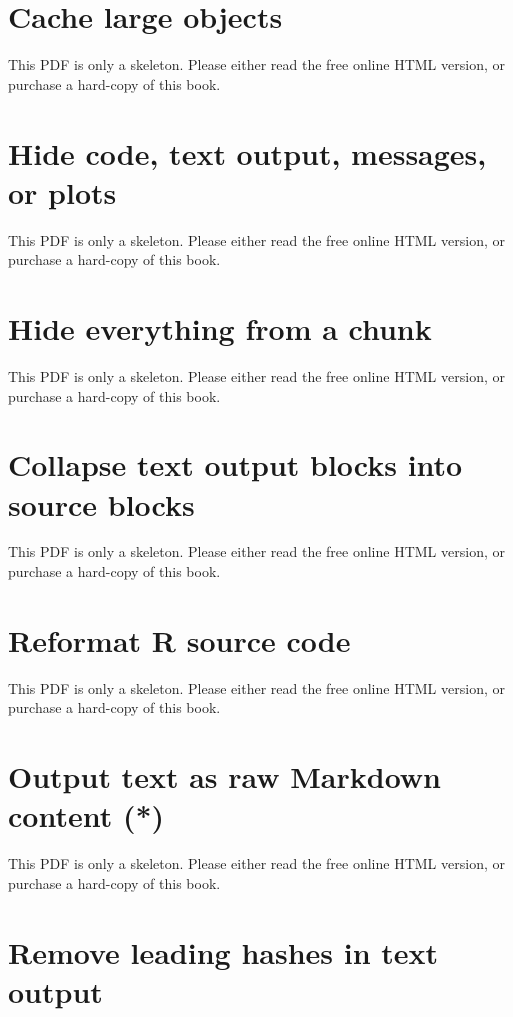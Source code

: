 \documentclass[
  11pt,
]{krantz}
\begin{document}
\section{Cache large objects}\label{cache-lazy}

This PDF is only a skeleton. Please either read the free online HTML version, or purchase a hard-copy of this book.

\section{Hide code, text output, messages, or plots}\label{hide-one}

This PDF is only a skeleton. Please either read the free online HTML version, or purchase a hard-copy of this book.

\section{Hide everything from a chunk}\label{hide-all}

This PDF is only a skeleton. Please either read the free online HTML version, or purchase a hard-copy of this book.

\section{Collapse text output blocks into source blocks}\label{opts-collapse}

This PDF is only a skeleton. Please either read the free online HTML version, or purchase a hard-copy of this book.

\section{Reformat R source code}\label{opts-tidy}

This PDF is only a skeleton. Please either read the free online HTML version, or purchase a hard-copy of this book.

\section{Output text as raw Markdown content (*)}\label{results-asis}

This PDF is only a skeleton. Please either read the free online HTML version, or purchase a hard-copy of this book.

\section{Remove leading hashes in text output}\label{opts-comment}
\end{document}
